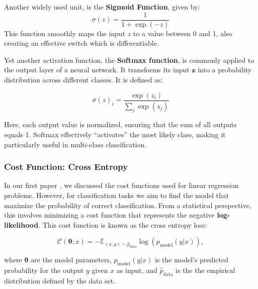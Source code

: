 \documentclass{article}
\begin{document}
\begin{multicols}{2}
Another widely used unit, is the \textbf{Sigmoid Function}, given by: \begin{equation*}
    \sigma(z) = \frac{1}{1 + \exp (-z)}
\end{equation*} This function smoothly maps the input $z$ to a value between 0 and 1, also creating an effective switch which is differentiable. \cite{goodfellow_deep_2016}

Yet another activation function, the \textbf{Softmax function}, is commonly applied to the output layer of a neural network. It transforms its input $\bm{z}$ into a probability distribution across different classes. It is defined as:

\begin{equation*} 
\sigma(z)_i = \frac{\exp(z_i)}{\sum_{j} \exp(z_j)} \end{equation*}

Here, each output value is normalized, ensuring that the sum of all outputs equals 1. Softmax effectively ``activates'' the most likely class, making it particularly useful in multi-class classification. \cite{hastie_elements_2009}

\subsubsection*{Cost Function: Cross Entropy}
In our first paper \cite{oa_brovold_eg_hansen_hg_kornstad_regression_2024}, we discussed the cost functions used for linear regression problems. However, for classification tasks we aim to find the model that maximize the probability of correct classification. 
From a statistical perspective, this involves minimizing a cost function that represents the negative \textbf{log-likelihood}. This cost function is known as the cross entropy loss:

\begin{equation*}
    \mathcal{C}(\boldsymbol{\theta}; x) = -\mathbb{E}_{(x, y) \sim \hat{p}_{\text{data}}} \log (p_{\text{model}}(y | x)),
\end{equation*}

where $\boldsymbol{\theta}$ are the model parameters, $p_{\text{model}}(y | x)$ is the model's predicted probability for the output $y$ given $x$ as input, and $\hat{p}_{\text{data}}$ is the the empirical distribution defined by the data set. \cite{goodfellow_deep_2016}


\end{multicols}
\end{document}
